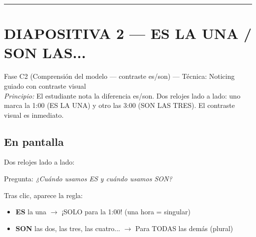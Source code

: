 \documentclass[a4paper,11pt]{article}
\begin{document}
\newpage


\noindent\textcolor{violeta}{\rule{\linewidth}{2.5pt}}

\section*{DIAPOSITIVA 2 — ES LA UNA / SON LAS...}

{\small Fase C2 (Comprensión del modelo — contraste es/son) — Técnica: Noticing guiado con contraste visual}\\
{\small\textit{Principio:} El estudiante nota la diferencia es/son. Dos relojes lado a lado: uno marca la 1:00 (ES LA UNA) y otro las 3:00 (SON LAS TRES). El contraste visual es inmediato.}

\vspace{0.5cm}

\subsection*{En pantalla}

Dos relojes lado a lado:

\begin{center}
\end{center}

\vspace{0.3cm}

Pregunta: \textit{¿Cuándo usamos ES y cuándo usamos SON?}

\vspace{0.3cm}

Tras clic, aparece la regla:
\begin{itemize}[leftmargin=2cm, itemsep=3pt]
\item \textbf{ES} la una $\rightarrow$ ¡SOLO para la 1:00! (una hora = singular)
\item \textbf{SON} las dos, las tres, las cuatro... $\rightarrow$ Para TODAS las demás (plural)
\end{itemize}
\end{document}
